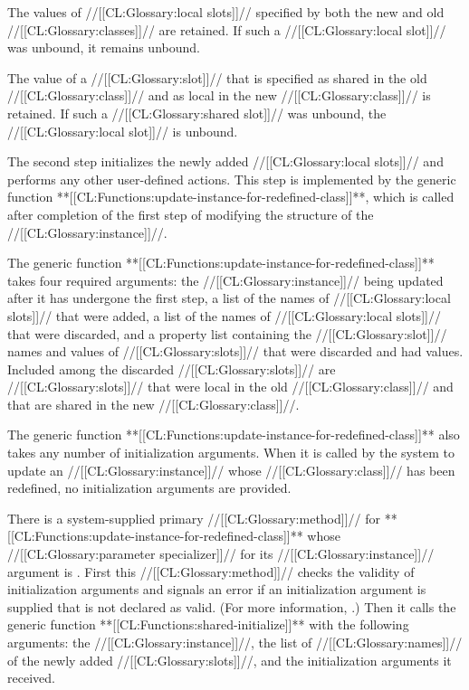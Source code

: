 The values of //[[CL:Glossary:local slots]]// specified by both the new and old
//[[CL:Glossary:classes]]// are retained. If such a //[[CL:Glossary:local slot]]// was unbound,
it remains unbound.

The value of a //[[CL:Glossary:slot]]// that is specified as shared in the old 
//[[CL:Glossary:class]]// and as local in the new //[[CL:Glossary:class]]// is retained.  If such 
a //[[CL:Glossary:shared slot]]// was unbound, the //[[CL:Glossary:local slot]]// is unbound.

\endsubsubsection%



The second step initializes the newly added //[[CL:Glossary:local slots]]// and performs
any other user-defined actions.  This step is implemented by the generic
function **[[CL:Functions:update-instance-for-redefined-class]]**, which is called after
completion of the first step of modifying the structure of the
//[[CL:Glossary:instance]]//.

The generic function **[[CL:Functions:update-instance-for-redefined-class]]** takes
four required arguments: the //[[CL:Glossary:instance]]// being updated after it has
undergone the first step, a list of the names of //[[CL:Glossary:local slots]]// that were
added, a list of the names of //[[CL:Glossary:local slots]]// that were discarded, and a
property list containing the //[[CL:Glossary:slot]]// names and values of 
//[[CL:Glossary:slots]]// that were
discarded and had values.  Included among the discarded //[[CL:Glossary:slots]]// are
//[[CL:Glossary:slots]]// that were local in the old //[[CL:Glossary:class]]// and that are shared in the new
//[[CL:Glossary:class]]//.
                      
The generic function **[[CL:Functions:update-instance-for-redefined-class]]** also
takes any number of initialization arguments.  When it is called by
the system to update an //[[CL:Glossary:instance]]// whose //[[CL:Glossary:class]]// 
has been redefined, no
initialization arguments are provided.
                                               
There is a system-supplied primary //[[CL:Glossary:method]]// for 
**[[CL:Functions:update-instance-for-redefined-class]]** whose //[[CL:Glossary:parameter specializer]]//
for its //[[CL:Glossary:instance]]// argument is .  
First this //[[CL:Glossary:method]]// checks the validity of initialization arguments and signals an
error if an initialization argument is supplied that is not declared
as valid.  (For more information, \seesection\DeclaringInitargValidity.)
Then it calls the generic function
**[[CL:Functions:shared-initialize]]** with the following arguments: the 
//[[CL:Glossary:instance]]//,
the list of //[[CL:Glossary:names]]// of 
the newly added //[[CL:Glossary:slots]]//, and the initialization
arguments it received.

